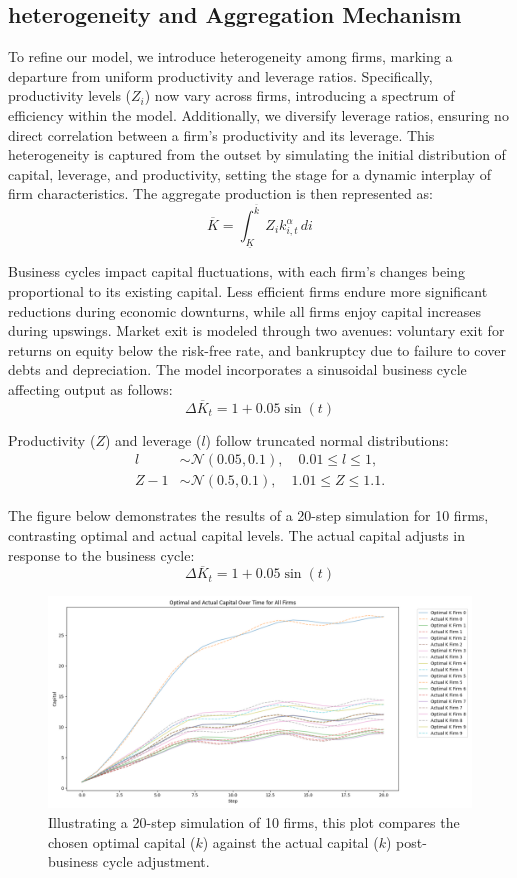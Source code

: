 \documentclass[12pt]{report}
\begin{document}
\subsection{heterogeneity and Aggregation Mechanism}

To refine our model, we introduce heterogeneity among firms, marking a departure from uniform productivity and leverage
ratios.  Specifically, productivity levels (\( Z_i \)) now vary across firms, introducing a spectrum of efficiency within
the model. Additionally, we diversify leverage ratios, ensuring no direct correlation between a firm's productivity and
its leverage. This heterogeneity is captured from the outset by simulating the initial distribution of capital,
leverage, and productivity, setting the stage for a dynamic interplay of firm characteristics. The aggregate production
is then represented as:
\[
\overline{K} = \int_{\underline{K} }^{\overline{k} }Z_i k_{i,t}^{\alpha}\,di
\]

Business cycles impact capital fluctuations, with each firm's changes being proportional to its existing capital. Less
efficient firms endure more significant reductions during economic downturns, while all firms enjoy capital increases
during upswings. Market exit is modeled through two avenues: voluntary exit for returns on equity below the risk-free
rate, and bankruptcy due to failure to cover debts and depreciation. The model incorporates a sinusoidal business
cycle affecting output as follows:
\[
\Delta \overline{K}_t = 1 + 0.05 \sin(t)
\]

Productivity (\( Z \)) and leverage (\( l \)) follow truncated normal distributions:
\begin{align}
    l &\sim \mathcal{N}(0.05, 0.1), \quad 0.01 \leq l \leq 1, \\
    Z-1 &\sim \mathcal{N}(0.5, 0.1), \quad 1.01 \leq Z \leq 1.1.
\end{align}

The figure below demonstrates the results of a 20-step simulation for 10 firms, contrasting optimal and actual capital
levels.  The actual capital adjusts in response to the business cycle:
\[
\Delta \overline{K}_t = 1 + 0.05 \sin(t)
\]

\begin{figure}[H]
    \centering
    \includegraphics[scale=0.4]{figure/OptimalK_noexit.png}
    \caption{Illustrating a 20-step simulation of 10 firms, this plot compares the chosen optimal capital (\(k\))
    against the
     actual capital (\(k\)) post-business cycle adjustment.}
    \label{fig:optKnoE}
\end{figure}
\end{document}
